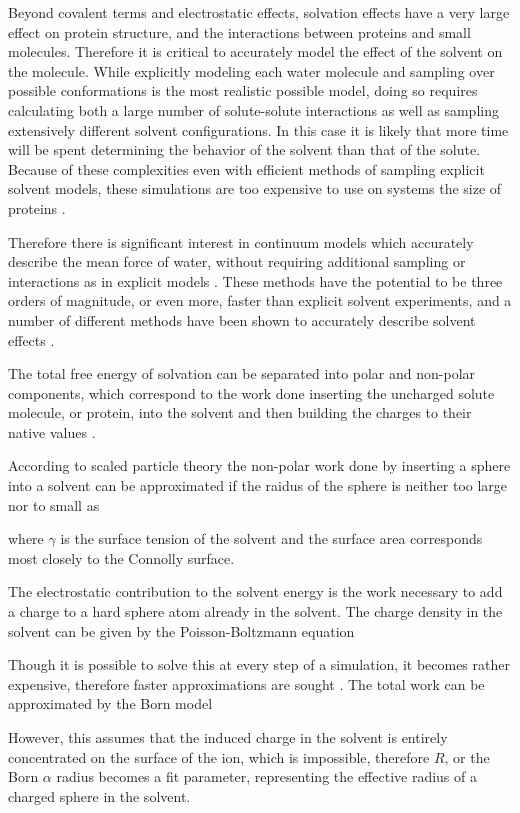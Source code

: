 Beyond covalent terms and electrostatic effects, solvation effects have a very large effect on protein structure, and the interactions between proteins and small molecules.
Therefore it is critical to accurately model the effect of the solvent on the molecule.
While explicitly modeling each water molecule and sampling over possible conformations is the most realistic possible model, doing so requires calculating both a large number of solute-solute interactions as well as sampling extensively different solvent configurations.
In this case it is likely that more time will be spent determining the behavior of the solvent than that of the solute.
Because of these complexities even with efficient methods of sampling explicit solvent models, these simulations are too expensive to use on systems the size of proteins \cite{figueirido1997large,zhang2001solvent}.

Therefore there is significant interest in continuum models which accurately describe the mean force of water, without requiring additional sampling or interactions as in explicit models \cite{zhang2001solvent,still1990semianalytical,qiu1997gb}.
These methods have the potential to be three orders of magnitude, or even more, faster than explicit solvent experiments, and a number of different methods have been shown to accurately describe solvent effects \cite{zhang2001solvent}.

The total free energy of solvation can be separated into polar and non-polar components, which correspond to the work done inserting the uncharged solute molecule, or protein, into the solvent and then building the charges to their native values \cite{roux1999implicit}.

According to scaled particle theory the non-polar work done by inserting a sphere into a solvent can be approximated if the raidus of the sphere is neither too large nor to small as

where $\gamma$ is the surface tension of the solvent and the surface area corresponds most closely to the Connolly surface.

The electrostatic contribution to the solvent energy is the work necessary to add a charge to a hard sphere atom already in the solvent.
The charge density in the solvent can be given by the Poisson-Boltzmann equation

Though it is possible to solve this at every step of a simulation, it becomes rather expensive, therefore faster approximations are sought \cite{nicholls1991rapid}.
The total work can be approximated by the Born model

However, this assumes that the induced charge in the solvent is entirely concentrated on the surface of the ion, which is impossible, therefore $R$, or the Born $\alpha$ radius becomes a fit parameter, representing the effective radius of a charged sphere in the solvent.

